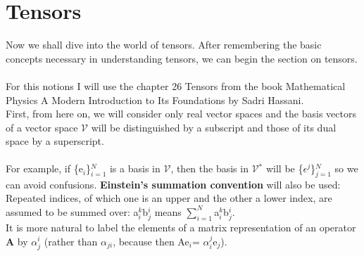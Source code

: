 \documentclass[12pt,a4paper]{article}
\begin{document}
\section{Tensors}
Now we shall dive into the world of tensors. After remembering the basic concepts necessary in understanding tensors, we can begin the section on tensors.\\\\
For this notions I will use the chapter 26 Tensors from the book Mathematical Physics A Modern Introduction to Its Foundations by Sadri Hassani.\\
First, from here on, we will consider only real vector spaces and the basis vectors of a vector space $\mathcal{V}$ will be distinguished by a subscript and those of its dual space by a superscript.\\\\For example, if \{e$_i$\}$^N_{i=1}$ is a basis in $\mathcal{V}$, then the basis in $\mathcal{V}$$^*$ will be \{$\epsilon^j$\}$^N_{j=1}$ so we can avoid confusions.\textbf{ Einstein's summation convention} will also be used:\\
Repeated indices, of which one is an upper and the other a lower index, are assumed to be summed over: a$^k_i$b$^i_j$ means $\sum^N_{i=1}$a$^k_i$b$^i_j$.\\
It is more natural to label the elements of a matrix representation of an operator \textbf{A} by $\alpha^i_j$ (rather than $\alpha_{ji}$, because then Ae$_i$= $\alpha^j_i$e$_j$).
\end{document}
